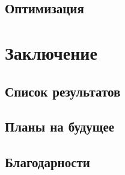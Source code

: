 \documentclass[12pt, twoside]{report}
\numberwithin{equation}{section}
\numberwithin{figure}{section}
\begin{document}
\section{Оптимизация} 


\chapter{Заключение}
\section{Список результатов}
\section{Планы на будущее}
\section{Благодарности}
\end{document}
